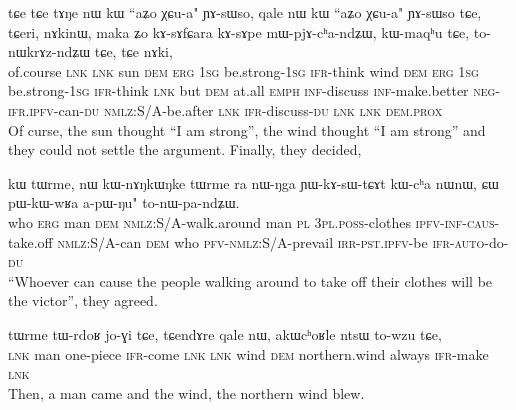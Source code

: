 \documentclass[oneside,a4paper,11pt]{article}
\newcommand{\ipab}[1]{{\phon#1}}
\begin{document}
\begin{exe} 
 \ex 
\gll  \ipab{lɯski} \ipab{tɕe} \ipab{tɕe} \ipab{tɤŋe} \ipab{nɯ} \ipab{kɯ} \ipab{``aʑo} \ipab{χɕu-a"} \ipab{ɲɤ-sɯso,} \ipab{qale} \ipab{nɯ} \ipab{kɯ} \ipab{``aʑo}  \ipab{χɕu-a"} \ipab{ɲɤ-sɯso} \ipab{tɕe,} \ipab{tɕeri,} \ipab{nɤkinɯ,} \ipab{maka} \ipab{ʑo} \ipab{kɤ-sɤfɕara} \ipab{kɤ-sɤpe} \ipab{mɯ-pjɤ-cʰa-ndʑɯ,} \ipab{kɯ-maqʰu} \ipab{tɕe,} \ipab{to-nɯkrɤz-ndʑɯ} \ipab{tɕe,} \ipab{tɕe} \ipab{nɤki,} \\ 
 of.course \textsc{lnk} \textsc{lnk} sun    \textsc{dem} \textsc{erg} 1\textsc{sg}  be.strong-1\textsc{sg} \textsc{ifr}-think wind \textsc{dem} \textsc{erg} 1\textsc{sg}  be.strong-1\textsc{sg} \textsc{ifr}-think \textsc{lnk}  but     \textsc{dem} at.all \textsc{emph} \textsc{inf}-discuss   \textsc{inf}-make.better  \textsc{neg}-\textsc{ifr}.\textsc{ipfv}-can-\textsc{du}    \textsc{nmlz}:S/A-be.after \textsc{lnk}  \textsc{ifr}-discuss-\textsc{du}    \textsc{lnk}  \textsc{lnk} \textsc{dem}.\textsc{prox}\\ 
 \glt  Of curse, the sun thought ``I am strong'', the wind thought ``I am strong'' and they could not settle the argument. Finally, they decided,
\end{exe} 
 
 

\begin{exe} 
 \ex 
\gll  \ipab{``ɕɯ} \ipab{kɯ} \ipab{tɯrme,} \ipab{nɯ} \ipab{kɯ-nɤŋkɯŋke} \ipab{tɯrme} \ipab{ra} \ipab{nɯ-ŋga} \ipab{ɲɯ-kɤ-sɯ-tɕɤt}  \ipab{kɯ-cʰa} \ipab{nɯnɯ,} \ipab{ɕɯ} \ipab{pɯ-kɯ-wʁa} \ipab{a-pɯ-ŋu"} \ipab{to-nɯ-pa-ndʑɯ.} \\ 
 who  \textsc{erg} man     \textsc{dem} \textsc{nmlz}:S/A-walk.around  man    \textsc{pl}  3\textsc{pl}.\textsc{poss}-clothes \textsc{ipfv}-\textsc{inf}-\textsc{caus}-take.off  \textsc{nmlz}:S/A-can  \textsc{dem}    who \textsc{pfv}-\textsc{nmlz}:S/A-prevail \textsc{irr}-\textsc{pst}.\textsc{ipfv}-be   \textsc{ifr}-\textsc{auto}-do-\textsc{du}\\ 
 \glt  ``Whoever can cause the people walking around to take off their clothes will be the victor'', they agreed.
\end{exe} 

 

\begin{exe} 
 \ex 
\gll  \ipab{tɕendɤre} \ipab{tɯrme} \ipab{tɯ-rdoʁ} \ipab{jo-ɣi} \ipab{tɕe,} \ipab{tɕendɤre} \ipab{qale} \ipab{nɯ,} \ipab{akɯcʰoʁle} \ipab{ntsɯ} \ipab{to-wzu} \ipab{tɕe,} \\ 
 \textsc{lnk}  man    one-piece \textsc{ifr}-come \textsc{lnk}  \textsc{lnk}  wind \textsc{dem} northern.wind always  \textsc{ifr}-make \textsc{lnk} \\ 
 \glt  Then, a man came and the wind, the northern wind blew.
\end{exe} 
\end{document}
